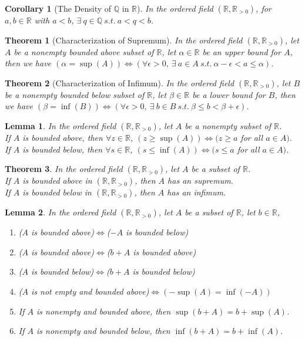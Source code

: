 \documentclass[11pt]{article}
\theoremstyle{break}
\theoremstyle{break}
\newtheorem{thm}{Theorem}[section]
\newtheorem{lem}{Lemma}[thm]
\newtheorem{corL}{Corollary}[lem]
\newcommand{\R}{\mathbb{R}}
\newcommand{\Q}{\mathbb{Q}}
\begin{document}
	\begin{corL}[The Density of $\Q$ in $\R$]
		In the ordered field $(\R,\R_{>0})$, for $a,b \in \R$ with $a<b$, $\exists \  q \in \Q \ s.t. \ a<q<b$.
	\end{corL} 
	
	\begin{thm}[Characterization of Supremum]
		In the ordered field $(\R,\R_{>0})$, let $A$ be a nonempty bounded above subset of $\R$, let $\alpha \in \R$ be an upper bound for $A$, then we have $(\alpha = \sup(A)) \iff ( \forall \epsilon >0, \ \exists \ a \in A \ s.t. \ \alpha - \epsilon <a\leq \alpha )$.
	\end{thm}
	
	\begin{thm}[Characterization of Infimum]
		In the ordered field $(\R,\R_{>0})$, let $B$ be a nonempty bounded below subset of $\R$, let $\beta \in \R$ be a lower bound for $B$, then we have $(\beta = \inf(B)) \iff ( \forall \epsilon >0, \ \exists \ b \in B \ s.t. \ \beta \leq b < \beta + \epsilon )$.
	\end{thm}
	
	\begin{lem}
		In the ordered field $(\R,\R_{>0})$, let $A$ be a nonempty subset of $\R$. \\If $A$ is bounded above, then $\forall z \in \R$, $(z \geq \sup(A)) \iff (z \geq a$ for all $a \in A)$. \\ If $A$ is bounded below, then $\forall s \in \R$, $(s \leq \inf(A)) \iff (s \leq a$ for all $a \in A)$.
	\end{lem}
	
	\begin{thm}
		In the ordered field $(\R,\R_{>0})$, let $A$ be a subset of $\R$.\\ If $A$ is bounded above in $(\R,\R_{>0})$, then $A$ has an supremum.\\ If $A$ is bounded below in $(\R,\R_{>0})$, then $A$ has an infimum.
	\end{thm}
	
	\begin{lem}
		In the ordered field $(\R,\R_{>0})$, let $A$ be a subset of $\R$, let $b \in \R$,
		\begin{enumerate}[topsep=3pt,itemsep=-1ex,partopsep=1ex,parsep=1ex]
			\item ($A$ is bounded above)$\iff$($-A$ is bounded below)
			\item ($A$ is bounded above)$\iff$($b+A$ is bounded above)
			\item ($A$ is bounded below)$\iff$($b+A$ is bounded below)
			\item ($A$ is not empty and bounded above)$\iff (-\sup(A)=\inf(-A))$
			\item If $A$ is nonempty and bounded above, then $\sup(b+A)=b+\sup(A)$.
			\item If $A$ is nonempty and bounded below, then $\inf(b+A)=b+\inf(A)$.	
		\end{enumerate}
	\end{lem}
	
\end{document}
